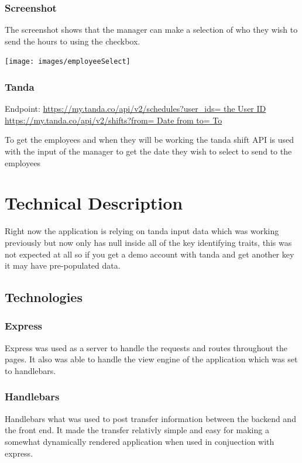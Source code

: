 \documentclass[12pt]{article}
\begin{document}
\subsubsection{Screenshot}
The screenshot shows that the manager can make a selection of who they wish to send the hours to using the checkbox.


\texttt{[image: images/employeeSelect]}\\[.1cm]



\subsubsection{Tanda}
Endpoint: \url{https://my.tanda.co/api/v2/schedules?user_ids= the User ID}
\url{https://my.tanda.co/api/v2/shifts?from= Date from to= To}

To get the employees and when they will be working the tanda shift API is used with the input of the manager to get the date they wish to select to send to the employees

\section{Technical Description}
Right now the application is relying on tanda input data which was working previously but now only has null inside all of the key
identifying traits, this was not expected at all so if you get a demo account with tanda and get another key it may have pre-populated data.

\subsection{Technologies}

\subsubsection{Express}
Express was used as a server to handle the requests and routes throughout the pages. It also was able to handle the view engine of the application which was set to handlebars.

\subsubsection{Handlebars}
 Handlebars what was used to post transfer information between the backend and the front end. It made the transfer relativly simple and easy for making a somewhat dynamically rendered application when used in conjuection with express.
\end{document}
